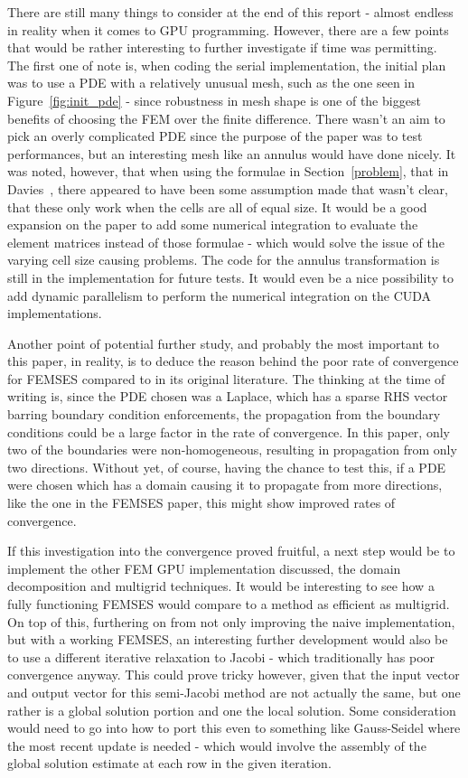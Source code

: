 There are still many things to consider at the end of this report - almost endless in reality when it comes to GPU programming. However, there are a few points that would be rather interesting to further investigate if time was permitting. The first one of note is, when coding the serial implementation, the initial plan was to use a PDE with a relatively unusual mesh, such as the one seen in Figure~\ref{fig:init_pde} - since robustness in mesh shape is one of the biggest benefits of choosing the FEM over the finite difference. There wasn't an aim to pick an overly complicated PDE since the purpose of the paper was to test performances, but an interesting mesh like an annulus would have done nicely. It was noted, however, that when using the formulae in Section~\ref{problem}, that in Davies~\cite{davies}, there appeared to have been some assumption made that wasn't clear, that these only work when the cells are all of equal size. It would be a good expansion on the paper to add some numerical integration to evaluate the element matrices instead of those formulae - which would solve the issue of the varying cell size causing problems. The code for the annulus transformation is still in the implementation for future tests. It would even be a nice possibility to add dynamic parallelism to perform the numerical integration on the CUDA implementations.

Another point of potential further study, and probably the most important to this paper, in reality, is to deduce the reason behind the poor rate of convergence for FEMSES compared to in its original literature. The thinking at the time of writing is, since the PDE chosen was a Laplace, which has a sparse RHS vector barring boundary condition enforcements, the propagation from the boundary conditions could be a large factor in the rate of convergence. In this paper, only two of the boundaries were non-homogeneous, resulting in propagation from only two directions. Without yet, of course, having the chance to test this, if a PDE were chosen which has a domain causing it to propagate from more directions, like the one in the FEMSES paper, this might show improved rates of convergence.

If this investigation into the convergence proved fruitful, a next step would be to implement the other FEM GPU implementation discussed, the domain decomposition and multigrid techniques. It would be interesting to see how a fully functioning FEMSES would compare to a method as efficient as multigrid. On top of this, furthering on from not only improving the naive implementation, but with a working FEMSES, an interesting further development would also be to use a different iterative relaxation to Jacobi - which traditionally has poor convergence anyway. This could prove tricky however, given that the input vector and output vector for this semi-Jacobi method are not actually the same, but one rather is a global solution portion and one the local solution. Some consideration would need to go into how to port this even to something like Gauss-Seidel where the most recent update is needed - which would involve the assembly of the global solution estimate at each row in the given iteration.

